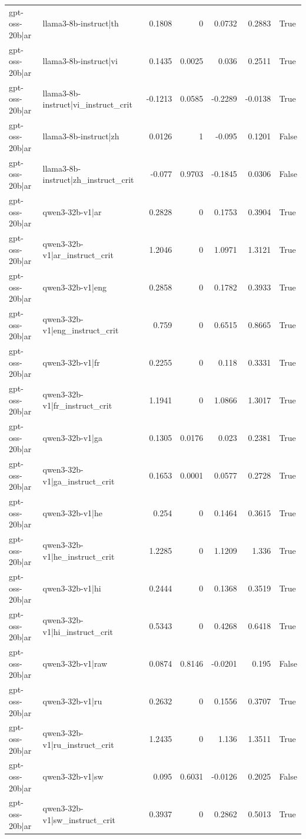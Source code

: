 \begin{table}
\begin{tabular}{l l r r r r l}
gpt-oss-20b|ar & llama3-8b-instruct|th & 0.1808 & 0 & 0.0732 & 0.2883 & True \\
gpt-oss-20b|ar & llama3-8b-instruct|vi & 0.1435 & 0.0025 & 0.036 & 0.2511 & True \\
gpt-oss-20b|ar & llama3-8b-instruct|vi_instruct_crit & -0.1213 & 0.0585 & -0.2289 & -0.0138 & True \\
gpt-oss-20b|ar & llama3-8b-instruct|zh & 0.0126 & 1 & -0.095 & 0.1201 & False \\
gpt-oss-20b|ar & llama3-8b-instruct|zh_instruct_crit & -0.077 & 0.9703 & -0.1845 & 0.0306 & False \\
gpt-oss-20b|ar & qwen3-32b-v1|ar & 0.2828 & 0 & 0.1753 & 0.3904 & True \\
gpt-oss-20b|ar & qwen3-32b-v1|ar_instruct_crit & 1.2046 & 0 & 1.0971 & 1.3121 & True \\
gpt-oss-20b|ar & qwen3-32b-v1|eng & 0.2858 & 0 & 0.1782 & 0.3933 & True \\
gpt-oss-20b|ar & qwen3-32b-v1|eng_instruct_crit & 0.759 & 0 & 0.6515 & 0.8665 & True \\
gpt-oss-20b|ar & qwen3-32b-v1|fr & 0.2255 & 0 & 0.118 & 0.3331 & True \\
gpt-oss-20b|ar & qwen3-32b-v1|fr_instruct_crit & 1.1941 & 0 & 1.0866 & 1.3017 & True \\
gpt-oss-20b|ar & qwen3-32b-v1|ga & 0.1305 & 0.0176 & 0.023 & 0.2381 & True \\
gpt-oss-20b|ar & qwen3-32b-v1|ga_instruct_crit & 0.1653 & 0.0001 & 0.0577 & 0.2728 & True \\
gpt-oss-20b|ar & qwen3-32b-v1|he & 0.254 & 0 & 0.1464 & 0.3615 & True \\
gpt-oss-20b|ar & qwen3-32b-v1|he_instruct_crit & 1.2285 & 0 & 1.1209 & 1.336 & True \\
gpt-oss-20b|ar & qwen3-32b-v1|hi & 0.2444 & 0 & 0.1368 & 0.3519 & True \\
gpt-oss-20b|ar & qwen3-32b-v1|hi_instruct_crit & 0.5343 & 0 & 0.4268 & 0.6418 & True \\
gpt-oss-20b|ar & qwen3-32b-v1|raw & 0.0874 & 0.8146 & -0.0201 & 0.195 & False \\
gpt-oss-20b|ar & qwen3-32b-v1|ru & 0.2632 & 0 & 0.1556 & 0.3707 & True \\
gpt-oss-20b|ar & qwen3-32b-v1|ru_instruct_crit & 1.2435 & 0 & 1.136 & 1.3511 & True \\
gpt-oss-20b|ar & qwen3-32b-v1|sw & 0.095 & 0.6031 & -0.0126 & 0.2025 & False \\
gpt-oss-20b|ar & qwen3-32b-v1|sw_instruct_crit & 0.3937 & 0 & 0.2862 & 0.5013 & True \\

\end{tabular}
\end{table}
